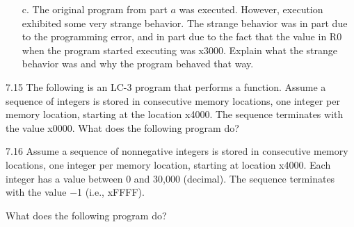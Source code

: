 \documentclass{patt}
\begin{document}
\begin{exercises}
\begin{enumerate}[a.]
\item[c.]  The original program from part $a$ was executed. However,
  execution exhibited some very strange behavior. The strange behavior
  was in part due to the programming error, and in part due to the
  fact that the value in R0 when the program started executing was
  x3000. Explain what the strange behavior was and why the program
  behaved that way.
\end{enumerate}

\item[7.15] The following is an LC-3 program that performs a function.
  Assume a sequence of integers is stored in consecutive memory
  locations, one integer per memory location, starting at the location
  x4000. The sequence terminates with the value x0000. What does the
  following program do?


\item[7.16] Assume a sequence of nonnegative integers is stored in
  consecutive memory locations, one integer per memory location,
  starting at location x4000.  Each integer has a value between 0 and
  30,000 (decimal).  The sequence terminates with the value $-$1
  (i.e., xFFFF).

What does the following program do?





\end{exercises}
\end{document}
